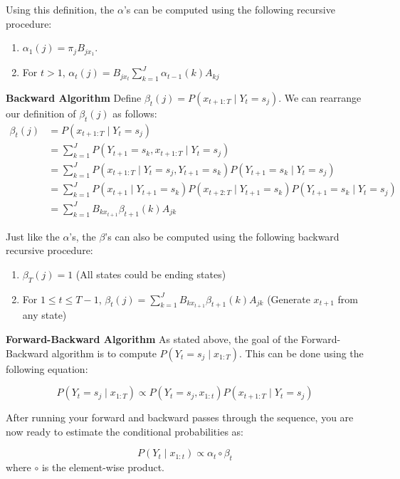 \documentclass[11pt,addpoints,answers]{exam}
\begin{document}
Using this definition, the $\alpha$'s can be computed using the following recursive procedure:
\begin{enumerate}
    \item $\alpha_1(j)=\pi_jB_{jx_1}$. 
    \item For $t > 1$, $\alpha_{t}(j)=B_{jx_{t}}\sum_{k=1}^{J}\alpha_{t-1}(k)A_{kj}$ 
\end{enumerate}

\clearpage

\textbf{Backward Algorithm}
Define $\beta_t(j) = P(x_{t+1:T} \mid Y_t=s_j)$. We can rearrange our definition of $\beta_t(j)$ as follows:
\begin{align}
    \label{eqn:beta}
    \beta_t(j) &= P(x_{t+1:T} \mid Y_t=s_j)\nonumber\\
    &= \sum_{k=1}^JP(Y_{t+1}=s_k,x_{t+1:T} \mid Y_t=s_j)\nonumber\\
    &= \sum_{k=1}^JP(x_{t+1:T} \mid Y_t=s_j,Y_{t+1}=s_k)P(Y_{t+1}=s_k \mid Y_t=s_j)\nonumber\\
    &= \sum_{k=1}^JP(x_{t+1} \mid Y_{t+1}=s_k)P(x_{t+2:T} \mid Y_{t+1}=s_k)P(Y_{t+1}=s_k \mid Y_t=s_j)\nonumber\\
    &= \sum_{k=1}^J B_{kx_{t+1}}\beta_{t+1}(k)A_{jk}
\end{align}


Just like the $\alpha$'s, the $\beta$'s can also be computed using the following backward recursive procedure:

\begin{enumerate}
    \item $\beta_T(j) = 1$ (All states could be ending states)
    \item  For $1\leq t \leq T-1$, $\beta_t(j) = \sum_{k=1}^{J}B_{kx_{t+1}}\beta_{t+1}(k)A_{jk}$ (Generate $x_{t+1}$ from any state)
\end{enumerate}


\textbf{Forward-Backward Algorithm}
As stated above, the goal of the Forward-Backward algorithm is to compute $P(Y_t =s_j \mid x_{1:T})$. This can be done using the following equation:

$$P(Y_t =s_j \mid x_{1:T}) \propto P(Y_t=s_j, x_{1:t})P(x_{t+1:T} \mid Y_t=s_j) $$

After running your forward and backward passes through the sequence, you are now ready to estimate the conditional probabilities as:

$$P(Y_t \mid x_{1:t}) \propto \alpha_t\circ\beta_t$$
where $\circ$ is the element-wise product.
\end{document}
